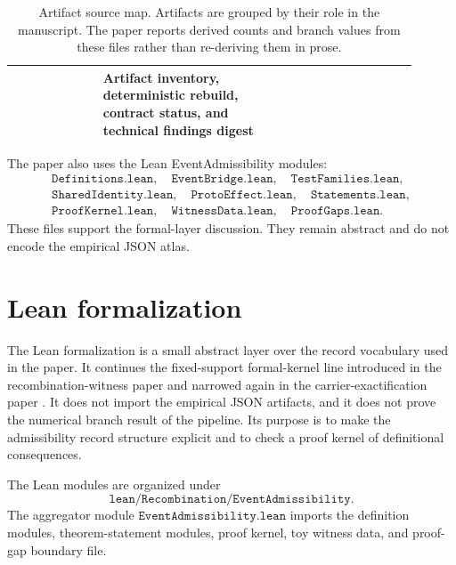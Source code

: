 \documentclass[11pt]{article}
\theoremstyle{definition}
\begin{document}
\begin{table}[h]
{\begin{tabular}{p{0.20\linewidth}p{0.39\linewidth}p{0.31\linewidth}}
&
Artifact inventory, deterministic rebuild, contract status, and technical findings digest
\\
\hline
\end{tabular}}
\caption{Artifact source map. Artifacts are grouped by their role in the manuscript. The paper reports derived counts and branch values from these files rather than re-deriving them in prose.}
\label{tab:appendix-artifact-source-map}
\end{table}

The paper also uses the Lean EventAdmissibility modules:
\[
\begin{gathered}
\texttt{Definitions.lean},\quad
\texttt{EventBridge.lean},\quad
\texttt{TestFamilies.lean},\\
\texttt{SharedIdentity.lean},\quad
\texttt{ProtoEffect.lean},\quad
\texttt{Statements.lean},\\
\texttt{ProofKernel.lean},\quad
\texttt{WitnessData.lean},\quad
\texttt{ProofGaps.lean}.
\end{gathered}
\]
These files support the formal-layer discussion. They remain abstract and do not encode the empirical JSON atlas.
 \section{Lean formalization}
\label{app:lean}

The Lean formalization is a small abstract layer over the record vocabulary used in the paper. It continues the fixed-support formal-kernel line introduced in the recombination-witness paper and narrowed again in the carrier-exactification paper \citep{Tsiokos2026RecombinationWitnesses,Tsiokos2026CarrierExactification}. It does not import the empirical JSON artifacts, and it does not prove the numerical branch result of the pipeline. Its purpose is to make the admissibility record structure explicit and to check a proof kernel of definitional consequences.

The Lean modules are organized under
\[
  \texttt{lean/Recombination/EventAdmissibility}.
\]
The aggregator module \(\texttt{EventAdmissibility.lean}\) imports the definition modules, theorem-statement modules, proof kernel, toy witness data, and proof-gap boundary file.
\end{document}
